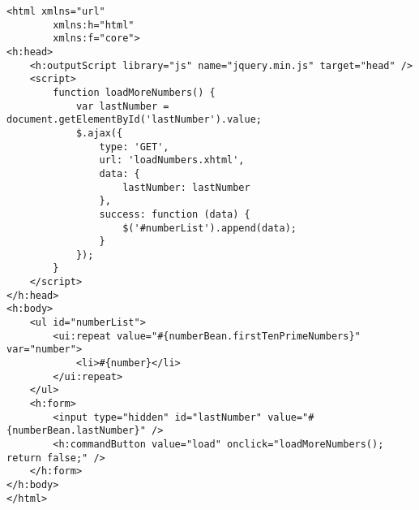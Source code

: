 \documentclass{article}
\begin{document}
\begin{lstlisting}[frame=single, basicstyle=\ttfamily, breaklines=true, breakatwhitespace=true, postbreak=\mbox{\textcolor{red}{$\hookrightarrow$}\space}]
<html xmlns="url"
        xmlns:h="html"
        xmlns:f="core">
<h:head>
    <h:outputScript library="js" name="jquery.min.js" target="head" />
    <script>
        function loadMoreNumbers() {
            var lastNumber = document.getElementById('lastNumber').value;
            $.ajax({
                type: 'GET',
                url: 'loadNumbers.xhtml',
                data: {
                    lastNumber: lastNumber
                },
                success: function (data) {
                    $('#numberList').append(data);
                }
            });
        }
    </script>
</h:head>
<h:body>
    <ul id="numberList">
        <ui:repeat value="#{numberBean.firstTenPrimeNumbers}" var="number">
            <li>#{number}</li>
        </ui:repeat>
    </ul>
    <h:form>
        <input type="hidden" id="lastNumber" value="#{numberBean.lastNumber}" />
        <h:commandButton value="load" onclick="loadMoreNumbers(); return false;" />
    </h:form>
</h:body>
</html>
    
\end{lstlisting}
\end{document}
